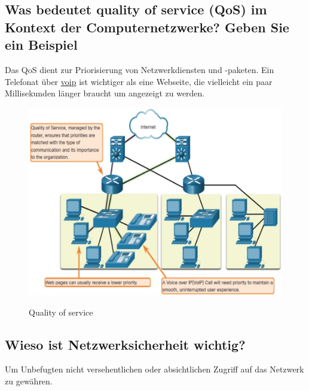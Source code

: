 \subsection*{Was bedeutet \flqq quality of service (QoS)\frqq{} im Kontext der Computernetzwerke? Geben Sie ein Beispiel}
Das QoS dient zur Priorisierung von Netzwerkdiensten und -paketen. Ein Telefonat über \underline{\acrshort{voip}} ist wichtiger als eine Webseite, die vielleicht ein paar Millisekunden länger braucht um angezeigt zu werden.
\begin{figure}[H]
    \begin{center}
    \label{pic:qos}
    \includegraphics[width=\textwidth]{images/qos.jpg}
    \caption{Quality of service}
    \end{center}
\end{figure}

\subsection*{Wieso ist Netzwerksicherheit wichtig?}
Um Unbefugten nicht versehentlichen oder absichtlichen Zugriff auf das Netzwerk zu gewähren.

